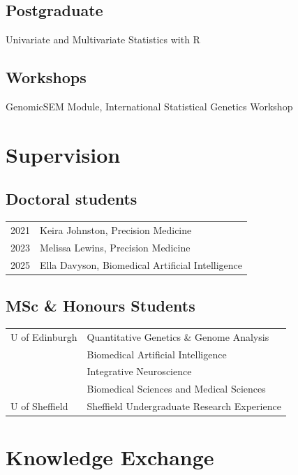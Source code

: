 \documentclass[11pt]{article}
\begin{document}
\subsection*{Postgraduate}

Univariate and Multivariate Statistics with R 

\subsection*{Workshops}

GenomicSEM Module, International Statistical Genetics Workshop

\section*{Supervision}

\subsection*{Doctoral students}

\begin{tabular}{p{3cm}p{12cm}}

2021 & Keira Johnston, Precision Medicine \\
2023 & Melissa Lewins, Precision Medicine \\
2025 & Ella Davyson, Biomedical Artificial Intelligence

\end{tabular}

\subsection*{MSc \& Honours Students}

\begin{tabular}{p{3cm}p{12cm}}
U of Edinburgh & Quantitative Genetics \& Genome Analysis \\
& Biomedical Artificial Intelligence \\
& Integrative Neuroscience \\
& Biomedical Sciences and Medical Sciences \\
U of Sheffield & Sheffield Undergraduate Research Experience 
\end{tabular}

\section*{Knowledge Exchange}
\end{document}
